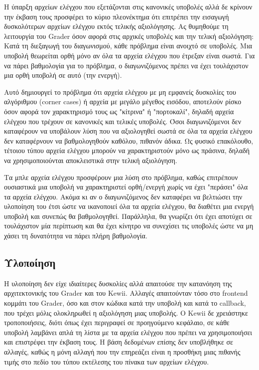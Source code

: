 \documentclass[diploma]{softlab-thesis}
\begin{document}
\bigskip

Η ύπαρξη αρχείων ελέγχου που εξετάζονται στις κανονικές υποβολές αλλά δε
κρίνουν την έκβαση τους προσφέρει το κύριο πλεονέκτημα ότι επιτρέπει την
εισαγωγή δυσκολότερων αρχείων ελέγχου εκτός τελικής αξιολόγησης. Ας θυμηθούμε
τη λειτουργία του Grader όσον αφορά στις αρχικές υποβολές και την τελική
αξιολόγηση: Κατά τη διεξαγωγή του διαγωνισμού, κάθε πρόβλημα είναι ανοιχτό σε
υποβολές. Μια υποβολή θεωρείται ορθή μόνο αν όλα τα αρχεία ελέγχου που έτρεξαν
είναι σωστά. Για να πάρει βαθμολογία για το πρόβλημα, ο διαγωνιζόμενος πρέπει
να έχει τουλάχιστον μια ορθή υποβολή σε αυτό (την ενεργή).

\bigskip

Αυτό δημιουργεί το πρόβλημα ότι αρχεία ελέγχου με μη εμφανείς δυσκολίες του
αλγόριθμου (corner cases) ή αρχεία με μεγάλο μέγεθος εισόδου, αποτελούν
ρίσκο όσον αφορά τον χαρακτηρισμό τους ως "κίτρινα" ή "πορτοκαλί", δηλαδή
αρχεία ελέγχου που τρέχουν σε κανονικές και τελικές υποβολές.  Όσοι
διαγωνιζόμενοι δεν καταφέρουν να υποβάλουν λύση που να αξιολογηθεί σωστά σε όλα
τα αρχεία ελέγχου δεν καταφέρνουν να βαθμολογηθούν καθόλου, πιθανόν άδικα. Ως
φυσικό επακόλουθο, τέτοιου τύπου αρχεία ελέγχου μπορούν να χαρακτηριστούν μόνο
ως πράσινα, δηλαδή να χρησιμοποιούνται αποκλειστικά στην τελική αξιολόγηση.

\bigskip

Τα μπλε αρχεία ελέγχου προσφέρουν μια λύση στο πρόβλημα, καθώς επιτρέπουν
ουσιαστικά μια υποβολή να χαρακτηριστεί ορθή/ενεργή χωρίς να έχει "περάσει" όλα
τα αρχεία ελέγχου. Ακόμα κι αν ο διαγωνιζόμενος δεν καταφέρει να βελτιώσει την
υλοποίηση του έτσι ώστε να ικανοποιεί όλα τα αρχεία ελέγχου, θα διαθέτει μια
ενεργή υποβολή και συνεπώς θα βαθμολογηθεί. Παράλληλα, θα γνωρίζει ότι έχει
αποτύχει σε τουλάχιστον μία περίπτωση και θα έχει κίνητρο να συνεχίσει τις
υποβολές ώστε να μη χάσει τη δυνατότητα να πάρει πλήρη βαθμολογία.

\subsection{Υλοποίηση}

Η υλοποίηση δεν είχε ιδιαίτερες δυσκολίες αλλά απαιτούσε την κατανόηση της
αρχιτεκτονικής του Grader και του Kewii. Αλλαγές απαιτούνταν τόσο στο frontend
κομμάτι του Grader, όσο και στον κώδικα κατά την υποβολή και κατά το callback,
που τρέχει μόλις ολοκληρωθεί η αξιολόγηση μιας υποβολής. Ο Kewii δε χρειάστηκε
τροποποιήσεις, διότι όπως έχει περιγραφεί σε προηγούμενο κεφάλαιο, σε κάθε
υποβολή λαμβάνει απλά τη λίστα με τα αρχεία ελέγχου που πρέπει να
χρησιμοποιήσει και επιστρέφει την έκβαση τους. Η βάση δεδομένων επίσης δεν
υποβλήθηκε σε αλλαγές, καθώς η μόνη αλλαγή που την επηρεάζει είναι η προσθήκη
μιας πιθανής τιμής στο πεδίο του τύπου εκτέλεσης του πίνακα των αρχείων
ελέγχου.
\end{document}
